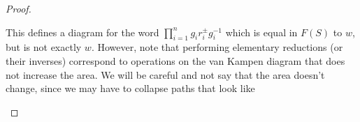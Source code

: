 \documentclass[a4paper]{article}
\DeclareMathOperator\Area{Area}
\begin{document}
\begin{proof}
\begin{center}
  \end{center}
  This defines a diagram for the word $\prod_{i = 1}^n g_i r_i^{\pm} g_i^{-1}$ which is equal in $F(S)$ to $w$, but is not exactly $w$. However, note that performing elementary reductions (or their inverses) correspond to operations on the van Kampen diagram that does not increase the area. We will be careful and not say that the area doesn't change, since we may have to collapse paths that look like
    \begin{center}
  \end{center}
%
%

\end{proof}
\end{document}

